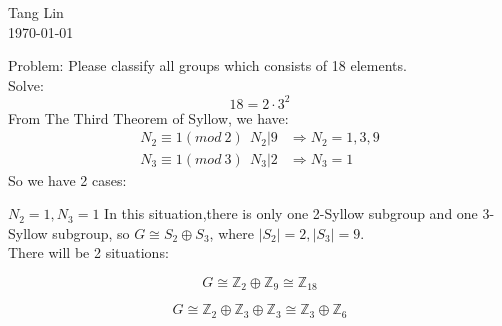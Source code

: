 \documentclass[a4paper,14pt]{article}
\begin{document}
    \begin{center}
        Tang Lin\\
        \today
    \end{center}

    Problem: Please classify all groups which consists of 18 elements.\\
    Solve:\\
    $$ 18 = 2\cdot 3^2 $$
    From The Third Theorem of Syllow, we have:
    \begin{align*}
        N_2 \equiv 1 (mod \ 2) \ \  N_2|9 &\Rightarrow N_2 = 1,3,9\\
        N_3 \equiv 1 (mod \ 3) \ \  N_3|2 &\Rightarrow N_3 = 1
    \end{align*}
    So we have 2 cases:
    \begin{enumerate}

        \begin{item}{$N_2 = 1, N_3 = 1$}
            In this situation,there is only one 2-Syllow subgroup and one 3-Syllow subgroup, so
            $G \cong S_2 \oplus S_3$, where $|S_2|=2,|S_3|=9$.\\
            There will be 2 situations:
            \begin{enumerate}
                \begin{item}
                    $$G \cong \mathbb{Z}_2 \oplus \mathbb{Z}_9 \cong \mathbb{Z}_{18} $$
                \end{item}
                \begin{item}
                    $$G \cong \mathbb{Z}_2 \oplus \mathbb{Z}_3 \oplus \mathbb{Z}_3 \cong \mathbb{Z}_3 \oplus \mathbb{Z}_6 $$
                \end{item}
            \end{enumerate}
        \end{item}


\end{enumerate}
\end{document}
